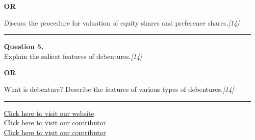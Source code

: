 \documentclass[11pt,a4paper]{article}
\newcommand{\pts}[1]{\hfill   \textit{[#1]}}
\begin{document}
\centerline{   \textbf{OR}}

Discuss the procedure for valuation of equity shares and preference shares.\pts{14}

\medskip\rule{\linewidth}{0.2pt}




\noindent   \textbf{Question 5.} \\
Explain the salient features of debentures.\pts{14}

\centerline{   \textbf{OR}}

What is debenture? Describe the features of various types of debentures.\pts{14}

\vfill
\rule{\linewidth}{0.4pt}

\begin{center}\small
\href{https://bhu-exam.vercel.app/}{Click here to visit our website}\\[4pt]
\href{https://me-aryan.vercel.app/}{Click here to visit our contributor}\\[4pt]
\href{https://quashan-me.vercel.app/}{Click here to visit our contributor}
\end{center}
\end{document}
